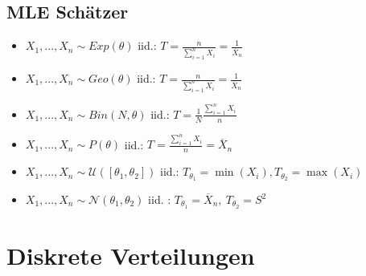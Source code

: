 \subsection{MLE Schätzer}
\begin{itemize}
	\item $X_1, ..., X_n \sim Exp(\theta)$ iid.: $T = \frac{n}{\sum_{i=1}^n X_i} = \frac{1}{\overline{X}_n}$
	\item $X_1, ..., X_n \sim Geo(\theta)$ iid.: $T = \frac{n}{\sum_{i=1}^n X_i} = \frac{1}{\overline{X}_n}$
	\item $X_1, ..., X_n \sim Bin(N, \theta)$ iid.: $T = \frac{1}{N}\frac{\sum_{i = 1}^n X_i}{n}$
	\item $X_1, ..., X_n \sim P(\theta)$ iid.: $T = \frac{\sum_{i = 1}^n X_i}{n} = \overline{X}_n$
	\item $X_1, ..., X_n \sim \mathcal{U}([\theta_1, \theta_2])$ iid.: $T_{\theta_1} = \min(X_i), T_{\theta_2} = \max(X_i)$
	\item $X_1, ..., X_n \sim \mathcal{N}(\theta_1, \theta_2)$ iid. : $T_{\theta_1} = \overline{X}_n, \ T_{\theta_2} = S^2$
\end{itemize}

\clearpage
\section{Diskrete Verteilungen}

